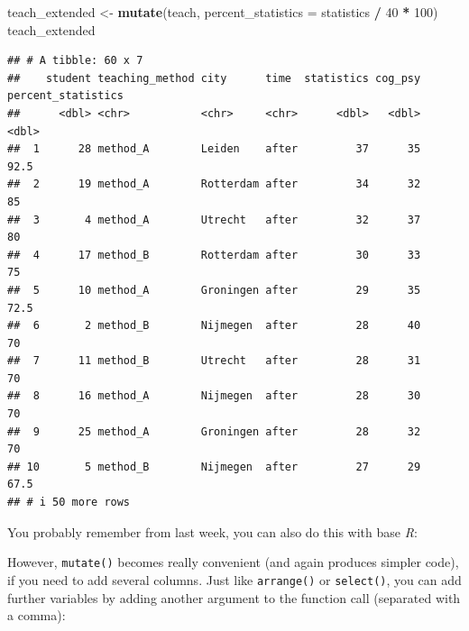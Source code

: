 \documentclass[
]{scrartcl}
\newenvironment{Shaded}{\begin{snugshade}}{\end{snugshade}}
\newcommand{\AttributeTok}[1]{\textcolor[rgb]{0.13,0.29,0.53}{#1}}
\newcommand{\DecValTok}[1]{\textcolor[rgb]{0.00,0.00,0.81}{#1}}
\newcommand{\FunctionTok}[1]{\textcolor[rgb]{0.13,0.29,0.53}{\textbf{#1}}}
\newcommand{\NormalTok}[1]{#1}
\newcommand{\OtherTok}[1]{\textcolor[rgb]{0.56,0.35,0.01}{#1}}
\newcommand{\SpecialCharTok}[1]{\textcolor[rgb]{0.81,0.36,0.00}{\textbf{#1}}}
\begin{document}
\begin{Shaded}
\begin{Highlighting}[]
\NormalTok{teach\_extended }\OtherTok{\textless{}{-}} \FunctionTok{mutate}\NormalTok{(teach, }\AttributeTok{percent\_statistics =}\NormalTok{ statistics }\SpecialCharTok{/} \DecValTok{40} \SpecialCharTok{*} \DecValTok{100}\NormalTok{)}
\NormalTok{teach\_extended}
\end{Highlighting}
\end{Shaded}

\begin{verbatim}
## # A tibble: 60 x 7
##    student teaching_method city      time  statistics cog_psy percent_statistics
##      <dbl> <chr>           <chr>     <chr>      <dbl>   <dbl>              <dbl>
##  1      28 method_A        Leiden    after         37      35               92.5
##  2      19 method_A        Rotterdam after         34      32               85  
##  3       4 method_A        Utrecht   after         32      37               80  
##  4      17 method_B        Rotterdam after         30      33               75  
##  5      10 method_A        Groningen after         29      35               72.5
##  6       2 method_B        Nijmegen  after         28      40               70  
##  7      11 method_B        Utrecht   after         28      31               70  
##  8      16 method_A        Nijmegen  after         28      30               70  
##  9      25 method_A        Groningen after         28      32               70  
## 10       5 method_B        Nijmegen  after         27      29               67.5
## # i 50 more rows
\end{verbatim}

You probably remember from last week, you can also do this with base \emph{R}:

\begin{Shaded}
\end{Shaded}

However, \texttt{mutate()} becomes really convenient (and again produces simpler code), if you need to add several columns. Just like \texttt{arrange()} or \texttt{select()}, you can add further variables by adding another argument to the function call (separated with a comma):
\end{document}
